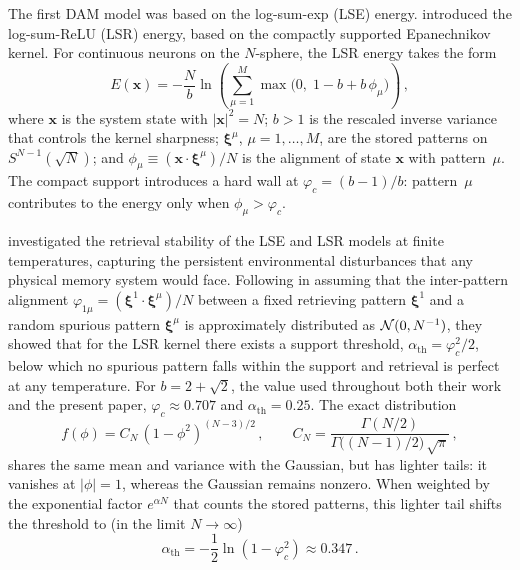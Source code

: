 \documentclass[11pt]{article}
\newcommand{\bxi}{\boldsymbol{\xi}}
\newcommand{\bx}{\bm{x}}
\begin{document}
The first DAM model was based on the log-sum-exp (LSE) energy. \citet{hoover2025dense} introduced the log-sum-ReLU (LSR) energy, based on the compactly supported Epanechnikov kernel. For continuous neurons on the $N$-sphere, the LSR energy takes the form
\begin{equation}
E(\bx) = -\frac{N}{b}\ln\left(\sum_{\mu=1}^{M}\max\!\Big(0,\;1 - b + b\,\phi_\mu\Big)\right)\,,
\label{eq:lsr}
\end{equation}
where $\bx$ is the system state with $|\bx|^2 = N$; $b > 1$ is the rescaled inverse variance that controls the kernel sharpness; $\bxi^\mu$, $\mu = 1,\ldots,M$, are the stored patterns on $S^{N-1}(\!\sqrt{N})$; and $\phi_\mu \equiv (\bx \cdot \bxi^\mu)/N$ is the alignment of state $\bx$ with pattern~$\mu$. The compact support introduces a hard wall at $\varphi_c = (b-1)/b$: pattern~$\mu$ contributes to the energy only when $\phi_\mu > \varphi_c$.

\citet{icml2026theory} investigated the retrieval stability of the LSE and LSR models at finite temperatures, capturing the persistent environmental disturbances that any physical memory system would face. Following \citet{ramsauer2021hopfield} in assuming that the inter-pattern alignment $\varphi_{1\mu} = (\bxi^1 \cdot \bxi^\mu)/N$ between a fixed retrieving pattern $\bxi^1$ and a random spurious pattern $\bxi^\mu$ is approximately distributed as ${\cal N}(0,N^{-1})$, they showed that for the LSR kernel there exists a support threshold, $\alpha_{\mathrm{th}} = \varphi_c^2/2$, below which no spurious pattern falls within the support and retrieval is perfect at any temperature. For $b = 2+\sqrt{2}$, the value used throughout both their work and the present paper, $\varphi_c \approx 0.707$ and $\alpha_{\mathrm{th}} = 0.25$. The exact distribution
\begin{equation}
f(\phi) = C_N\,(1 - \phi^2)^{(N-3)/2}\,,\qquad
C_N = \frac{\Gamma(N/2)}{\Gamma\!\big((N\!-\!1)/2\big)\,\sqrt{\pi}}\,,
\label{eq:exact_density}
\end{equation}
shares the same mean and variance with the Gaussian, but has lighter tails: it vanishes at $|\phi| = 1$, whereas the Gaussian remains nonzero. When weighted by the exponential factor $e^{\alpha N}$ that counts the stored patterns, this lighter tail shifts the threshold to (in the limit $N\to\infty$)
\begin{equation}
\alpha_{\mathrm{th}} = -\frac{1}{2}\ln(1-\varphi_c^2) \approx 0.347\,.
\label{eq:alpha_th}
\end{equation}
\end{document}
